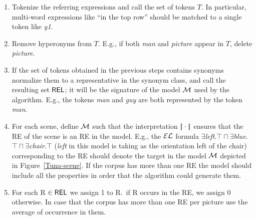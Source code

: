 \begin{enumerate}
\item Tokenize the referring expressions and call the set of tokens $T$. In particular, multi-word expressions like ``in the top row'' 
should be matched to a single token like \emph{y1}.

\item Remove hyperonyms from $T$. E.g., if both \emph{man} and \emph{picture} appear in $T$, delete \emph{picture}.

\item If the set of tokens obtained in the previous steps contains synonyms normalize them to a representative in the synonym class, 
and call the resulting set $\textsf{REL}$; it will be the signature of the model $\mathcal{M}$ used by the algorithm. E.g., the tokens \emph{man} 
and \emph{guy} are both represented by the token \emph{man}.

\item For each scene, define $\mathcal{M}$ such that the interpretation $|\!|\cdot|\!|$ ensures that the RE of the scene is an RE in the model.
 E.g., the $\mathcal{EL}$ formula $\exists$\emph{left}.$\top \sqcap \exists$\emph{blue}.$\top \sqcap \exists$\emph{chair}.$\top$ (\emph{left} in this model is taking as the orientation left of the chair) corresponding to the RE should denote the target in the model $\mathcal{M}$ depicted in Figure~\ref{Tuna-scene}. If the corpus has more than one RE the model should include all the properties in order that the algorithm could generate them.

\item For each R $\in \textsf{REL}$ we assign 1 to R.\puse\ if R occurs in the RE, we assign 0 otherwise. In case that the corpus has more than one RE per picture use the average of occurrence in them.

\end{enumerate}




